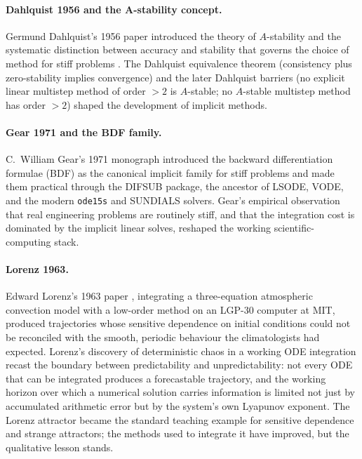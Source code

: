 \paragraph{Dahlquist 1956 and the A-stability concept.} Germund
Dahlquist's 1956 paper introduced the theory of $A$-stability and
the systematic distinction between accuracy and stability that
governs the choice of method for stiff problems
\cite{hist:v2c07-dahlquist-1956}. The Dahlquist equivalence theorem
(consistency plus zero-stability implies convergence) and the
later Dahlquist barriers (no explicit linear multistep method of
order $> 2$ is $A$-stable; no $A$-stable multistep method has
order $> 2$) shaped the development of implicit methods.

\paragraph{Gear 1971 and the BDF family.} C.\ William Gear's 1971
monograph \cite{hist:v2c07-gear-1971} introduced the backward
differentiation formulae (BDF) as the canonical implicit family
for stiff problems and made them practical through the DIFSUB
package, the ancestor of LSODE, VODE, and the modern \texttt{ode15s}
and SUNDIALS solvers. Gear's empirical observation that real
engineering problems are routinely stiff, and that the integration
cost is dominated by the implicit linear solves, reshaped the
working scientific-computing stack.

\paragraph{Lorenz 1963.} Edward Lorenz's 1963 paper
\cite{hist:v2c07-lorenz-1963}, integrating a three-equation atmospheric
convection model with a low-order method on an LGP-30 computer at
MIT, produced trajectories whose sensitive dependence on initial
conditions could not be reconciled with the smooth, periodic
behaviour the climatologists had expected. Lorenz's discovery of
deterministic chaos in a working ODE integration recast the
boundary between predictability and unpredictability: not every
ODE that can be integrated produces a forecastable trajectory,
and the working horizon over which a numerical solution carries
information is limited not just by accumulated arithmetic error
but by the system's own Lyapunov exponent. The Lorenz attractor
became the standard teaching example for sensitive dependence and
strange attractors; the methods used to integrate it have improved,
but the qualitative lesson stands.


